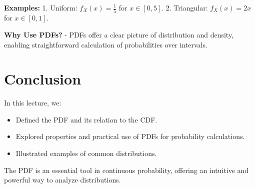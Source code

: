 \documentclass{article}
\begin{document}
\textbf{Examples:}
1. Uniform: $f_X(x) = \frac{1}{5}$ for $x \in [0, 5]$.
2. Triangular: $f_X(x) = 2x$ for $x \in [0, 1]$.

\textbf{Why Use PDFs?}
- PDFs offer a clear picture of distribution and density, enabling straightforward calculation of probabilities over intervals.

\section*{Conclusion}

In this lecture, we:
\begin{itemize}
  \item Defined the PDF and its relation to the CDF.
  \item Explored properties and practical use of PDFs for probability calculations.
  \item Illustrated examples of common distributions.
\end{itemize}

The PDF is an essential tool in continuous probability, offering an intuitive and powerful way to analyze distributions.
\end{document}
